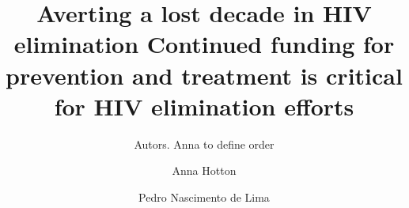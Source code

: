 \documentclass[preprint,12pt]{elsarticle}
\begin{document}
\begin{frontmatter}





\title{Averting a lost decade in HIV elimination \newline Continued funding for prevention and treatment is critical for HIV elimination efforts}


\author[UCHICAGO]{Autors. Anna to define order} %

\author[UCHICAGO]{Anna Hotton} %

\author[RANDVA]{Pedro Nascimento de Lima} %




\end{frontmatter}
\end{document}
